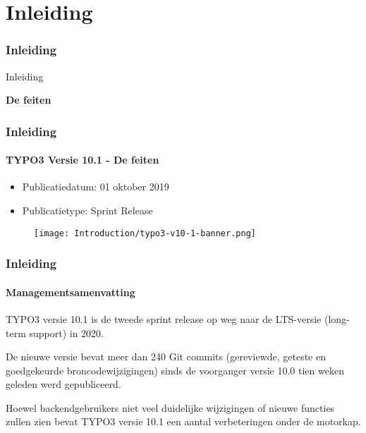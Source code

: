 %

\section{Inleiding}
\begin{frame}[fragile]
	\frametitle{Inleiding}

	\begin{center}\huge{Inleiding}\end{center}
	\begin{center}\huge{\color{typo3darkgrey}\textbf{De feiten}}\end{center}

\end{frame}


\begin{frame}[fragile]
	\frametitle{Inleiding}
	\framesubtitle{TYPO3 Versie 10.1 - De feiten}

	\begin{itemize}
		\item Publicatiedatum: 01 oktober 2019
		\item Publicatietype: Sprint Release
	\end{itemize}

	\begin{figure}
		\texttt{[image: Introduction/typo3-v10-1-banner.png]}
	\end{figure}

\end{frame}


\begin{frame}[fragile]
	\frametitle{Inleiding}
	\framesubtitle{Managementsamenvatting}

	\small
		TYPO3 versie 10.1 is de tweede sprint release op weg naar de LTS-versie
		(long-term support) in 2020.

		\vspace{0.2cm}

		De nieuwe versie bevat meer dan 240 Git commits (gereviewde, geteste en
	    goedgekeurde broncodewijzigingen) sinds de voorganger versie 10.0 tien
		weken geleden werd gepubliceerd.

		\vspace{0.2cm}

		Hoewel backendgebruikers niet veel duidelijke wijzigingen of nieuwe functies
		zullen zien bevat TYPO3 versie 10.1 een aantal verbeteringen onder de motorkap.

	\normalsize

\end{frame}

